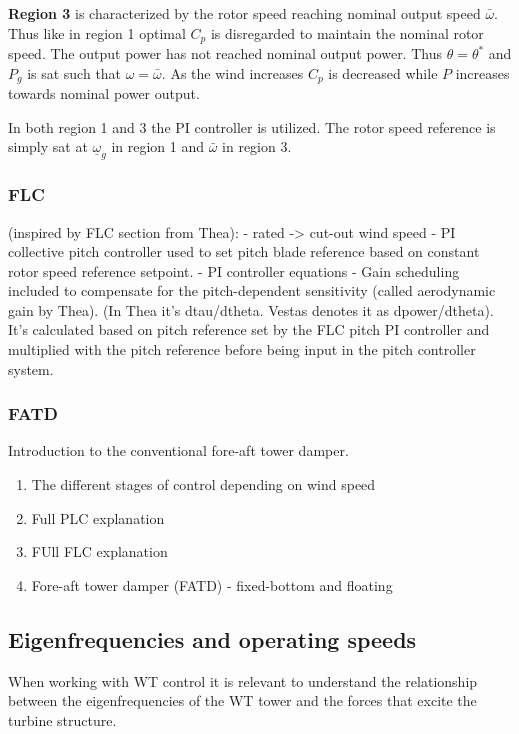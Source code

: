 \textbf{Region 3} is characterized by the rotor speed reaching nominal output speed $ \bar{\omega} $. Thus like in region 1 optimal $ C_p $ is disregarded to maintain the nominal rotor speed. The output power has not reached nominal output power. Thus $ \theta = \theta^* $ and $ P_g $ is sat such that $ \omega = \bar{\omega} $. As the wind increases $ C_p $ is decreased while $ P $ increases towards nominal power output. 

In both region 1 and 3 the PI controller is utilized. The rotor speed reference is simply sat at $ \underline{\omega}_g $ in region 1 and $ \bar{\omega} $ in region 3.



\subsubsection{FLC}

(inspired by FLC section from Thea):
- rated -> cut-out wind speed
- PI collective pitch controller used to set pitch blade reference based on constant rotor speed reference setpoint.
- PI controller equations
- Gain scheduling included to compensate for the pitch-dependent sensitivity (called aerodynamic gain by Thea). (In Thea it's dtau/dtheta. Vestas denotes it as dpower/dtheta). It's calculated based on pitch reference set by the FLC pitch PI controller and multiplied with the pitch reference before being input in the pitch controller system.

\subsubsection{FATD}
Introduction to the conventional fore-aft tower damper.


\medskip
\medskip
\medskip
\medskip




\begin{enumerate}
	\item The different stages of control depending on wind speed
	\item Full PLC explanation
	\item FUll FLC explanation
	\item Fore-aft tower damper (FATD) - fixed-bottom and floating
\end{enumerate}

\subsection{Eigenfrequencies and operating speeds} \label{sec:eigenfreq}
When working with WT control it is relevant to understand the relationship between the eigenfrequencies of the WT tower and the forces that excite the turbine structure.


